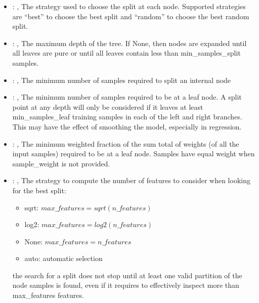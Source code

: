 \begin{itemize}
    \item {}: , 
      The strategy used to choose the split at each node. Supported strategies are ``best''
      to choose the best split and ``random'' to choose the best random split.

    \item {}: , 
      The maximum depth of the tree. If None, then nodes are expanded until all leaves are pure
      or until all leaves contain less than min\_samples\_split samples.

    \item {}: , 
      The minimum number of samples required to split an internal node

    \item {}: , 
      The minimum number of samples required to be at a leaf node. A split point at any
      depth will only be considered if it leaves at least min\_samples\_leaf training samples in
      each                                                  of the left and right branches. This may
      have the effect of smoothing the model, especially
      in regression.

    \item {}: , 
      The minimum weighted fraction of the sum total of weights (of all the input samples)
      required to be at a leaf node. Samples have equal weight when sample\_weight is not provided.

    \item {}: , 
      The strategy to compute the number of features to consider when looking for the best split:
      \begin{itemize}                                                     \item sqrt:
      $max\_features=sqrt(n\_features)$                                                     \item
      log2: $max\_features=log2(n\_features)$
      \item None: $max\_features=n\_features$
      \item auto: automatic selection
      \end{itemize}                                                   \nb the search for a split
      does not stop until at least one valid partition of the node
      samples is found, even if it requires to effectively inspect more than max\_features features.


\end{itemize}
